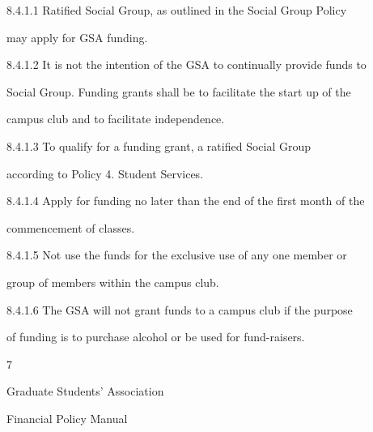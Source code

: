8.4.1.1        Ratified  Social  Group,  as outlined  in the  Social  Group  Policy  

     may apply for GSA funding.   



8.4.1.2        It is not the intention of the GSA to continually provide funds to  

     Social Group. Funding grants shall be to facilitate the start up of the  

     campus club and to facilitate independence.   



8.4.1.3        To   qualify   for   a   funding   grant,   a   ratified                      Social   Group  

     according to Policy 4. Student Services.  



8.4.1.4        Apply for funding no later than the end of the first month of the  

     commencement of classes.   



8.4.1.5        Not use the funds for the exclusive use of any one member or  

     group of members within the campus club.   



8.4.1.6        The GSA will not grant funds to a campus club if the purpose  

     of funding is to purchase alcohol or be used for fund-raisers.   



  



  



  



  



  



  



  



  



  



  



  



  



                                                         7  

                                    

                                    

                                  Graduate Students’ Association  

                                      Financial Policy Manual  

  


